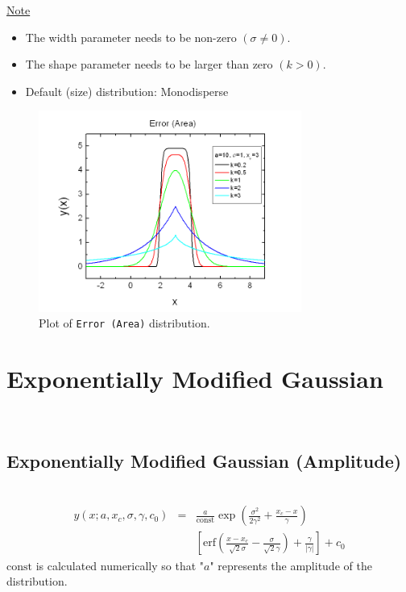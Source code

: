 \uline{Note}
\begin{itemize}
  \item The width parameter needs to be non-zero $(\sigma\neq 0)$.
  \item The shape parameter needs to be larger than zero $(k>0)$.
  \item Default (size) distribution: Monodisperse
\end{itemize}
\begin{figure}[htb]
\begin{center}
\includegraphics[width=0.768\textwidth]{ErrorArea.png}
\end{center}
\caption{Plot of \texttt{Error (Area)} distribution.}
\label{fig:ErrorArea}
\end{figure}

\clearpage
\section{Exponentially Modified Gaussian} ~\\
\label{sec:ExponentiallyModifiedGaussian}
\subsection{Exponentially Modified Gaussian (Amplitude)} \hspace{1pt} \\
\label{sec:ExponentiallyModifiedGaussianAmplitude}
\begin{eqnarray}
y(x;a,x_c,\sigma,\gamma,c_0) & = &
\frac{a}{\mathrm{const}}
\exp\left(\frac{\sigma^2}{2\gamma^2}+\frac{x_c-x}{\gamma}\right) \nonumber \\
& & \left[\mathrm{erf}\left(\frac{x-x_c}{\sqrt{2}\sigma}-\frac{\sigma}{\sqrt{2}\gamma}\right)+\frac{\gamma}{| \gamma |}\right]
+c_0
\end{eqnarray}
$\mbox{const}$ is calculated numerically so that "$a$" represents the amplitude of the distribution.
\vspace{5mm}

